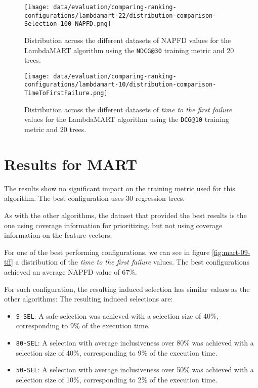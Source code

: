 \begin{figure}
    \centering
    \begin{minipage}{.45\textwidth}
        \centering
        \label{fig:lambdamart-22-napfd}
        \texttt{[image: data/evaluation/comparing-ranking-configurations/lambdamart-22/distribution-comparison-Selection-100-NAPFD.png]}
        \parbox{0.9\textwidth}{\caption{Distribution across the different datasets of NAPFD values for the LambdaMART algorithm using the \texttt{NDCG@30} training metric and 20 trees.}}
    \end{minipage}%
    \begin{minipage}{.45\textwidth}
        \centering
        \label{fig:lambdamart-10-tff}
        \texttt{[image: data/evaluation/comparing-ranking-configurations/lambdamart-10/distribution-comparison-TimeToFirstFailure.png]}
        \parbox{0.9\textwidth}{\caption{Distribution across the different datasets of \emph{time to the first failure} values for the LambdaMART algorithm using the \texttt{DCG@10} training metric and 20 trees.}}
    \end{minipage}%
\end{figure}

\section{Results for MART}
The results show no significant impact on the training metric used for this algorithm. The best configuration uses 30 regression trees.

As with the other algorithms, the dataset that provided the best results is the one using coverage information for prioritizing, but
not using coverage information on the feature vectors.

For one of the best performing configurations, we can see in figure \ref{fig:mart-09-tff} a distribution of
the \emph{time to the first failure} values. The best configurations achieved an average NAPFD value of 67\%.

For such configuration, the resulting induced selection has similar values as the other algorithms:
The resulting induced selections are:
\begin{itemize}
    \item \texttt{S-SEL}: A safe selection was achieved with a selection size of 40\%, corresponding to 9\% of the execution time.
    \item \texttt{80-SEL}: A selection with average inclusiveness over 80\% was achieved with a selection size of 40\%, corresponding to 9\% of the execution time.
    \item \texttt{50-SEL}: A selection with average inclusiveness over 50\% was achieved with a selection size of 10\%, corresponding to 2\% of the execution time.
\end{itemize}

